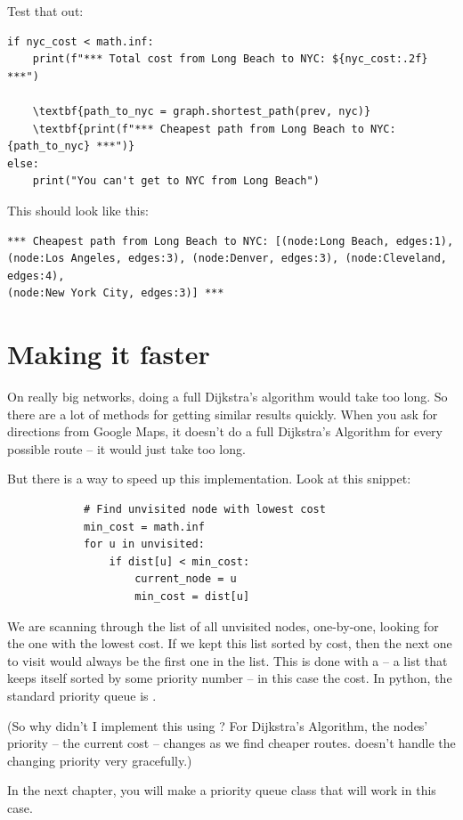 Test that out:

\begin{Verbatim}[commandchars=\\\{\}]
if nyc_cost < math.inf:
    print(f"*** Total cost from Long Beach to NYC: ${nyc_cost:.2f} ***")

    \textbf{path_to_nyc = graph.shortest_path(prev, nyc)}
    \textbf{print(f"*** Cheapest path from Long Beach to NYC: {path_to_nyc} ***")}
else:
    print("You can't get to NYC from Long Beach")
\end{Verbatim}

This should look like this:
\begin{verbatim}
*** Cheapest path from Long Beach to NYC: [(node:Long Beach, edges:1),
(node:Los Angeles, edges:3), (node:Denver, edges:3), (node:Cleveland, edges:4),
(node:New York City, edges:3)] ***
\end{verbatim}

\section{Making it faster}

On really big networks, doing a full Dijkstra's algorithm would take
too long. So there are a lot of methods for getting similar results
quickly.  When you ask for directions from Google Maps, it doesn't do
a full Dijkstra's Algorithm for every possible route -- it would just
take too long.

But there is a way to speed up this implementation. Look at this snippet:

\begin{verbatim}
            # Find unvisited node with lowest cost
            min_cost = math.inf
            for u in unvisited:
                if dist[u] < min_cost:
                    current_node = u
                    min_cost = dist[u]
\end{verbatim}

We are scanning through the list of all unvisited nodes, one-by-one,
looking for the one with the lowest cost.  If we kept this list sorted
by cost, then the next one to visit would always be the first one in
the list. This is done with a  -- a list that
keeps itself sorted by some priority number -- in this case the
cost. In python, the standard priority queue is .

(So why didn't I implement this using ? For Dijkstra's
Algorithm, the nodes' priority -- the current cost --  changes as we find
cheaper routes.  doesn't handle the changing priority
very gracefully.)

In the next chapter, you will make a priority queue class that will
work in this case.
